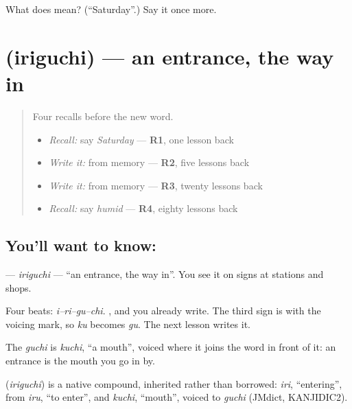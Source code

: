 \begin{tcolorbox}[breakable,colback=teal!4,colframe=teal!35!black,title={Before you move on}]
What does  mean? (\textquotedblleft{}Saturday\textquotedblright{}.) Say it once more.
\end{tcolorbox}
\section[\texorpdfstring{\ja{いりぐち} (iriguchi)}{いりぐち (iriguchi)}]{ (iriguchi) — an entrance, the way in}

\label{lesson:JA-C135-iriguchi}



\begin{quote}
Four recalls before the new word.

\begin{itemize}
\raggedright
  \item \emph{Recall:} say \emph{Saturday} — \textbf{R1}, one lesson back
  \item \emph{Write it:} \textbf{} from memory — \textbf{R2}, five lessons back
  \item \emph{Write it:} \textbf{} from memory — \textbf{R3}, twenty lessons back
  \item \emph{Recall:} say \emph{humid} — \textbf{R4}, eighty lessons back
\end{itemize}
\end{quote}

\subsection*{You'll want to know: }
\textbf{} — \emph{iriguchi} — \textquotedblleft{}an entrance, the way in\textquotedblright{}. You see it on signs at stations and shops.

Four beats: \emph{i–ri–gu–chi}. \textbf{}, \textbf{} and \textbf{} you already write. The third sign is \textbf{} with the voicing mark, so \emph{ku} becomes \emph{gu}. The next lesson writes it.

The \emph{guchi} is \emph{kuchi}, \textquotedblleft{}a mouth\textquotedblright{}, voiced where it joins the word in front of it: an entrance is the mouth you go in by.

\begin{cousinweb}
\textbf{} (\emph{iriguchi}) is a native compound, inherited rather than borrowed: \emph{iri}, \textquotedblleft{}entering\textquotedblright{}, from \emph{iru}, \textquotedblleft{}to enter\textquotedblright{}, and \emph{kuchi}, \textquotedblleft{}mouth\textquotedblright{}, voiced to \emph{guchi} (JMdict, KANJIDIC2).
\end{cousinweb}

